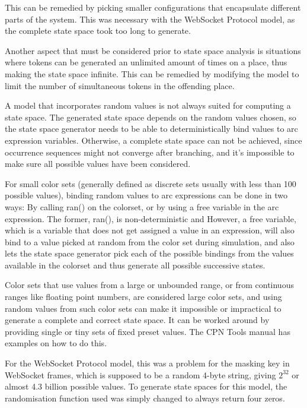 		This can be remedied by picking smaller configurations that encapsulate
		different parts of the system. This was necessary with the WebSocket Protocol
		model, as the complete state space took too long to generate.
		
		Another aspect that must be considered prior to state space analysis is
		situations where tokens can be generated an unlimited amount of times on a
		place, thus making the state space infinite. This can be remedied by modifying
		the model to limit the number of simultaneous tokens in the offending place.
		
		A model that incorporates random values is not always suited for computing a
		state space. The generated state space depends on the random values
		chosen, so the state space generator needs to be able to deterministically
		bind values to arc expression variables.
		Otherwise, a complete state space can not be achieved, since occurrence
		sequences might not converge after branching,  and it's impossible to make sure all possible values have
		been considered.
		
		For small color sets (generally defined as discrete sets usually with less
		than 100 possible values), binding random values to arc expressions can be
		done in two ways: By calling ran() on the colorset, or by using a free
		variable in the arc expression. The former, ran(), is non-deterministic and
		However, a free variable, which is a variable that does not get assigned a
		value in an expression, will also bind to a value picked at random from the
		color set during simulation, and also lets the state space generator pick each
		of the possible bindings from the values available in the colorset and thus
		generate all possible successive states.
		
		Color sets that use values from a large or unbounded range, or from continuous
		ranges like floating point numbers, are considered large color sets, and using
		random values from such color sets can make it impossible or impractical
		to generate a complete and correct state space. It can be worked around by
		providing single or tiny sets of fixed preset values. The CPN Tools manual has
		examples on how to do this.
		
		For the WebSocket Protocol model, this was a problem for the masking
		key in WebSocket frames, which is supposed to be a random 4-byte string,
		giving $2^{32}$ or almost 4.3 billion possible values.
		To generate state spaces for this model, the randomisation function used was
		simply changed to always return four zeros.

